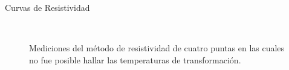 \documentclass[11pt]{beamer}
\begin{document}
			\begin{frame}{Curvas de Resistividad}
				\begin{figure}[H]
				\captionsetup[subfloat]{labelformat=empty}
					\centering
					 \qquad
					\\
					\caption*{Mediciones del método de resistividad de cuatro puntas en las cuales no fue posible hallar las temperaturas de transformación.}
				\end{figure}
			\end{frame}
		
\end{document}
